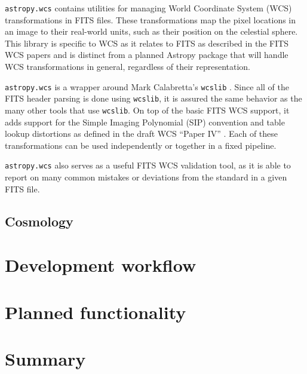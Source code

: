 \documentclass[traditabstract]{aa}
\begin{document}

\texttt{astropy.wcs} contains utilities for managing World Coordinate
System (WCS) transformations in FITS files.  These transformations map
the pixel locations in an image to their real-world units, such as
their position on the celestial sphere.  This library is specific to
WCS as it relates to FITS as described in the FITS WCS papers
\citep{greisen2002wcs,calabretta2002wcs,greisen2006wcs} and is
distinct from a planned Astropy package that will handle WCS
transformations in general, regardless of their representation.

\texttt{astropy.wcs} is a wrapper around Mark Calabretta's
\texttt{wcslib} \citep{calabretta2013wcslib}.  Since all of the FITS
header parsing is done using \texttt{wcslib}, it is assured the same
behavior as the many other tools that use \texttt{wcslib}.  On top of
the basic FITS WCS support, it adds support for the Simple Imaging
Polynomial (SIP) convention and table lookup distortions as defined in
the draft WCS ``Paper IV'' \citep{calabretta2004wcs}.  Each of these
transformations can be used independently or together in a fixed
pipeline.

\texttt{astropy.wcs} also serves as a useful FITS WCS validation tool,
as it is able to report on many common mistakes or deviations from the
standard in a given FITS file.

\subsection{Cosmology}



\section{Development workflow}

\label{sec:workflow}




\section{Planned functionality}

\label{sec:future}



\section{Summary}

\label{sec:summary}




\end{document}
